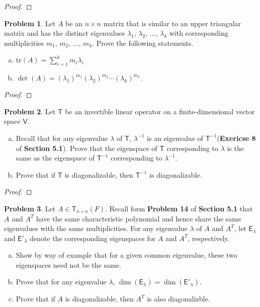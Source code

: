 \documentclass[12pt]{book}
\theoremstyle{definition}
\newtheorem{problem}{Problem}
\begin{document}
	\begin{proof}
	\end{proof}
	\newpage
	\begin{problem}
		Let $A$ be an $n\times n$ matrix that is similar to an upper triangular matrix and has the distinct eigenvalues $\lambda_1$, $\lambda_2$, $\ldots$, $\lambda_k$ with corresponding multiplicities $m_1$, $m_2$, $\ldots$, $m_k$. Prove the following statements.
		\begin{enumerate}[(a)]
			\item $\text{tr}(A)=\displaystyle\sum_{i=1}^k m_i\lambda_i$
			\item $\det(A)=(\lambda_1)^{m_1}(\lambda_2)^{m_2}\cdots(\lambda_k)^{m_k}.$
		\end{enumerate}
	\end{problem}
	\begin{proof}
	\end{proof}
	\newpage
	\begin{problem}
		Let $\mathsf{T}$ be an invertible linear operator on a finite-dimensional vector space $\mathsf{V}$.
		\begin{enumerate}[(a)]
			\item Recall that for any eigenvalue $\lambda$ of $\mathsf{T}$, $\lambda^{-1}$ is an eigenvalue of $\mathsf{T}^{-1}$(\textbf{Exericse 8} of \textbf{Section 5.1}). Prove that the eigenspace of $\mathsf{T}$ corresponding to $\lambda$ is the same as the eigenspace of $\mathsf{T}^{-1}$ corresponding to $\lambda^{-1}$.
			\item Prove that if $\mathsf{T}$ is diagonalizable, then $\mathsf{T}^{-1}$ is diagonalizable.
		\end{enumerate}
	\end{problem}
	\begin{proof}
	\end{proof}
	\newpage
	\begin{problem}
		Let $A\in\mathsf{T}_{n\times n}(F)$. Recall form \textbf{Problem 14} of \textbf{Section 5.1} that $A$ and $A^T$ have the same characteristic polynomial and hence share the same eigenvalues with the same multiplicities. For any eigenvalue $\lambda$ of $A$ and $A^T$, let $\mathsf{E}_\lambda$ and $\mathsf{E'}_\lambda$ denote the corresponding eigenspaces for $A$ and $A^T$, respectively.
		\begin{enumerate}[(a)]
			\item Show by way of example that for a given common eigenvalue, these two eigenspaces need not be the same.
			\item Prove that for any eigenvalue $\lambda$, $\dim(\mathsf{E}_\lambda)=\dim(\mathsf{E'}_{\lambda})$.
			\item Prove that if $A$ is diagonalizable, then $A^T$ is also diagonalizble.
		\end{enumerate}
	\end{problem}
\end{document}
